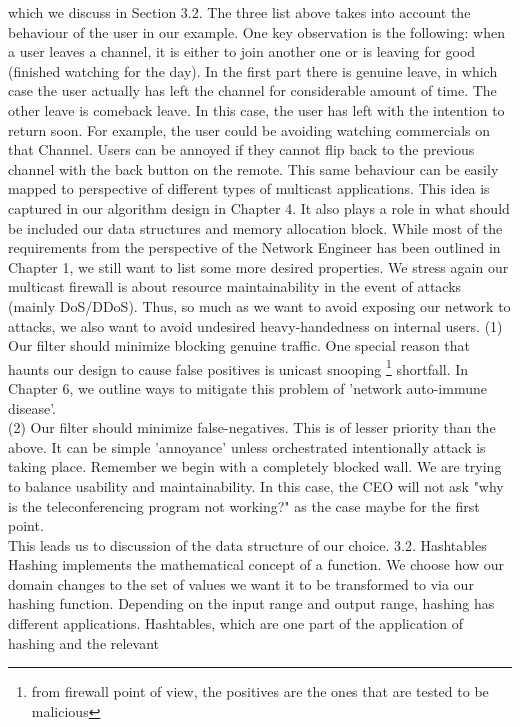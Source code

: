 \documentclass[11pt,left=2cm,bottom=2cm,oneside]{book}
\begin{document}
which we
discuss in Section 3.2.
The three list above takes into account the behaviour of the user in our
example.
One key observation is the following: when a user leaves a channel, it is
either to
join another one or is leaving for good (finished watching for the day). In
the first
part there is genuine leave, in which case the user actually has left the
channel for
considerable amount of time. The other leave is comeback leave. In this case,
the
user has left with the intention to return soon. For example, the user
could
be avoiding watching commercials on that Channel. Users can be annoyed if they
cannot flip back to the previous channel with the back button on the remote.
This
same behaviour can be easily mapped to perspective of different types of
multicast
applications. This idea is captured in our algorithm design in Chapter 4. It
also
plays a role in what should be included our data structures and memory
allocation
block.
While most of the requirements from the perspective of the Network Engineer
has been outlined in Chapter 1, we still want to list some more desired
properties.
We stress again our multicast firewall is about resource maintainability in
the event
of attacks (mainly DoS/DDoS). Thus, so much as we want to avoid exposing our
network to attacks, we also want to avoid undesired heavy-handedness on
internal
users.
(1) Our filter should minimize blocking genuine traffic. One special reason
that haunts our design to cause false positives is unicast snooping 
\footnote{from firewall point of view, the positives are the ones that are tested to be
malicious}
shortfall. In Chapter 6, we outline ways to mitigate this problem of 'network
auto-immune disease'.\\
(2) Our filter should minimize false-negatives. This is of lesser priority
than
the above. It can be simple 'annoyance' unless orchestrated intentionally
attack is taking place. Remember we begin with a completely blocked
wall. We are trying to balance usability and maintainability. In this case,
the CEO will not ask "why is the teleconferencing program not working?"
as the case maybe for the first point.\\
This leads us to discussion of the data structure of our choice.
3.2. Hashtables
Hashing implements the mathematical concept of a function. We choose how
our domain changes to the set of values we want it to be transformed to via
our
hashing function. Depending on the input range and output range, hashing has
different applications.
Hashtables, which are one part of the application of hashing and the relevant
\end{document}
